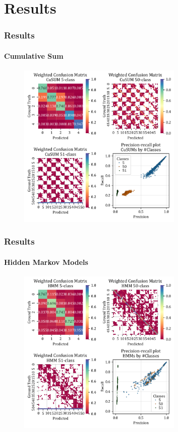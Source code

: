 \documentclass[xcolor={svgnames,table},10pt,fleqn]{beamer}
\begin{document}
\section{Results}
\begin{frame}
    \frametitle{Results}
    \framesubtitle{Cumulative Sum}
    \begin{figure}[h]
        \centering
        \includegraphics[width=0.7\textwidth]{05_mean_conf_mat_cusum.pdf}
    \end{figure}
\end{frame}

\begin{frame}
    \frametitle{Results}
    \framesubtitle{Hidden Markov Models}
    \begin{figure}[h]
        \centering
        \includegraphics[width=0.7\textwidth]{05_mean_conf_mat_hmm.pdf}
    \end{figure}
\end{frame}
\end{document}
